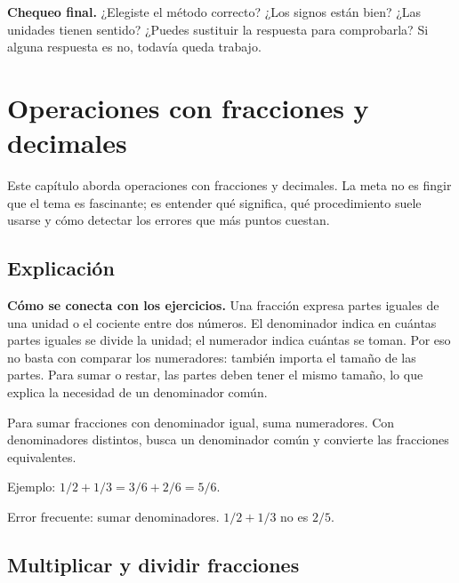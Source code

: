 \documentclass[10pt,oneside,openany]{book}
\begin{document}
\begin{idea}\textbf{Chequeo final.} ¿Elegiste el método correcto? ¿Los signos están bien? ¿Las unidades tienen sentido? ¿Puedes sustituir la respuesta para comprobarla? Si alguna respuesta es no, todavía queda trabajo.\end{idea}



\chapter{Operaciones con fracciones y decimales}

\begin{idea}
Este capítulo aborda operaciones con fracciones y decimales. La meta no es fingir que el tema es fascinante; es entender qué significa, qué procedimiento suele usarse y cómo detectar los errores que más puntos cuestan.
\end{idea}

\section{Explicación}

\textbf{Cómo se conecta con los ejercicios.} Una fracción expresa partes iguales de una unidad o el cociente entre dos números. El denominador indica en cuántas partes iguales se divide la unidad; el numerador indica cuántas se toman. Por eso no basta con comparar los numeradores: también importa el tamaño de las partes. Para sumar o restar, las partes deben tener el mismo tamaño, lo que explica la necesidad de un denominador común.

Para sumar fracciones con denominador igual, suma numeradores. Con denominadores distintos, busca un denominador común y convierte las fracciones equivalentes.



\begin{ejemplo}
Ejemplo: $1/2+1/3=3/6+2/6=5/6$.
\end{ejemplo}

\begin{ojo}
Error frecuente: sumar denominadores. $1/2+1/3$ no es $2/5$.
\end{ojo}



\section{Multiplicar y dividir fracciones}
\end{document}
